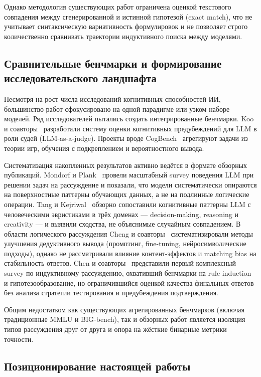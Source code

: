 Однако методология существующих работ ограничена оценкой текстового совпадения между сгенерированной и истинной гипотезой (exact match), что не учитывает синтаксическую вариативность формулировок и не позволяет строго количественно сравнивать траектории индуктивного поиска между моделями.

\subsection{Сравнительные бенчмарки и формирование исследовательского ландшафта}

Несмотря на рост числа исследований когнитивных способностей ИИ, большинство работ сфокусировано на одной парадигме или узком наборе моделей. Ряд исследователей пытались создать интегрированные бенчмарки. Koo и соавторы~\cite{koo2024benchmarking} разработали систему оценки когнитивных предубеждений для LLM в роли судей (LLM-as-a-judge). Проекты вроде CogBench~\cite{coda2024cogbench} агрегируют задачи из теории игр, обучения с подкреплением и вероятностного вывода.

Систематизация накопленных результатов активно ведётся в формате обзорных публикаций. Mondorf и Plank~\cite{mondorf2024beyond} провели масштабный survey поведения LLM при решении задач на рассуждение и показали, что модели систематически опираются на поверхностные паттерны обучающих данных, а не на подлинные логические операции. Tang и Kejriwal~\cite{tang2024humanlike} обзорно сопоставили когнитивные паттерны LLM с человеческими эвристиками в трёх доменах --- decision-making, reasoning и creativity --- и выявили сходства, не объяснимые случайным совпадением. В области логического рассуждения Cheng и соавторы~\cite{cheng2025empowering} систематизировали методы улучшения дедуктивного вывода (промптинг, fine-tuning, нейросимволические подходы), однако не рассматривали влияние контент-эффектов и matching bias на стабильность ответов. Chen и соавторы~\cite{chen2025inductive} представили первый комплексный survey по индуктивному рассуждению, охвативший бенчмарки на rule induction и гипотезообразование, но ограничившийся оценкой качества финальных ответов без анализа стратегии тестирования и предубеждения подтверждения.

Общим недостатком как существующих агрегированных бенчмарков (включая традиционные MMLU и BIG-bench), так и обзорных работ является изоляция типов рассуждения друг от друга и опора на жёсткие бинарные метрики точности.

\subsection{Позиционирование настоящей работы}

